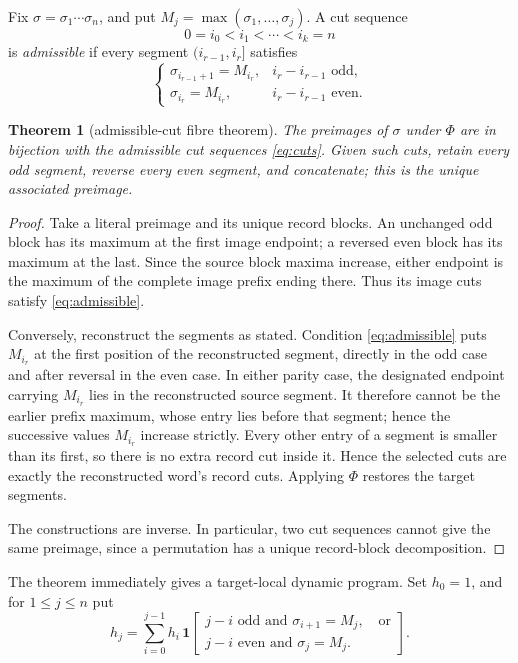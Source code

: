 \documentclass[10pt,a4paper]{amsart}
\newtheorem{theorem}{Theorem}[section]
\theoremstyle{definition}
\theoremstyle{remark}
\begin{document}
Fix \(\sigma=\sigma_1\cdots\sigma_n\), and put
\(M_j=\max(\sigma_1,\ldots,\sigma_j)\).  A cut sequence
\[
                         0=i_0<i_1<\cdots<i_k=n              \tag{3.1}\label{eq:cuts}
\]
is \emph{admissible} if every segment \((i_{r-1},i_r]\) satisfies
\[
\begin{cases}
 \sigma_{i_{r-1}+1}=M_{i_r},&i_r-i_{r-1}\text{ odd},\\
 \sigma_{i_r}=M_{i_r},&i_r-i_{r-1}\text{ even}.
\end{cases}                                                \tag{3.2}\label{eq:admissible}
\]

\begin{theorem}[admissible-cut fibre theorem]\label{thm:fibre}
The preimages of \(\sigma\) under \(\Phi\) are in bijection with the
admissible cut sequences \eqref{eq:cuts}.  Given such cuts, retain every odd
segment, reverse every even segment, and concatenate; this is the unique
associated preimage.
\end{theorem}

\begin{proof}
Take a literal preimage and its unique record blocks.  An unchanged odd
block has its maximum at the first image endpoint; a reversed even block has
its maximum at the last.  Since the source block maxima increase, either
endpoint is the maximum of the complete image prefix ending there.  Thus its
image cuts satisfy \eqref{eq:admissible}.

Conversely, reconstruct the segments as stated.  Condition \eqref{eq:admissible}
puts \(M_{i_r}\) at the first position of the reconstructed segment, directly
in the odd case and after reversal in the even case.  In either parity case,
the designated endpoint carrying \(M_{i_r}\) lies in the reconstructed source
segment.
It therefore cannot be the earlier prefix maximum, whose entry lies before
that segment; hence the successive values \(M_{i_r}\) increase strictly.
Every other entry of a segment
is smaller than its first, so there is no extra record cut inside it.  Hence
the selected cuts are exactly the reconstructed word's record cuts.
Applying \(\Phi\) restores the target segments.

The constructions are inverse.  In particular, two cut sequences cannot
give the same preimage, since a permutation has a unique record-block
decomposition.
\end{proof}

The theorem immediately gives a target-local dynamic program.  Set
\(h_0=1\), and for \(1\le j\le n\) put
\[
h_j=\sum_{i=0}^{j-1}h_i\,
\mathbf 1\!\left[
 \begin{array}{l}
 j-i\text{ odd and }\sigma_{i+1}=M_j,\quad\text{or}\\
 j-i\text{ even and }\sigma_j=M_j.
 \end{array}\right] .                                     \tag{3.3}\label{eq:fibredp}
\]
\end{document}

